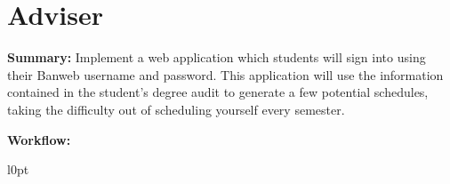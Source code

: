 \documentclass[10pt]{article}
\begin{document}
\pagebreak
\section{Adviser}

\textbf{Summary:} Implement a web application which students will sign
into using their Banweb username and password. This application will use the
information contained in the student's degree audit to generate a few potential
schedules, taking the difficulty out of scheduling yourself every semester.

\textbf{Workflow:}
\begin{wrapfigure}{l}{0pt}
  \begin{tikzpicture}
  \end{tikzpicture}
\end{wrapfigure}
\end{document}
